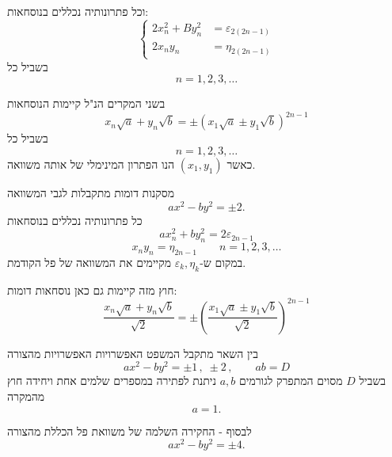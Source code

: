 וכל פתרונותיה נכללים בנוסחאות:
\[
\left\{
\begin{aligned}
2x_n^2 + By_n^2 &= \varepsilon_{2(2n-1)} \\
2x_ny_n &= \eta_{2(2n-1)}
\end{aligned}
\right.
\]
בשביל כל
\[ n = 1, 2, 3, \ldots \]

בשני המקרים הנ"ל קיימות הנוסחאות
\[ x_n\sqrt{a} + y_n\sqrt{b} = \pm(x_1\sqrt{a} \pm y_1\sqrt{b})^{2n-1} \]
בשביל כל
\[ n = 1, 2, 3, \ldots \]
כאשר $(x_1, y_1)$ הנו הפתרון המינימלי של אותה משוואה.

מסקנות דומות מתקבלות לגבי המשוואה
\[ ax^2 - by^2 = \pm 2 . \]
כל פתרונותיה נכללים בנוסחאות
\[ ax_n^2 + by_n^2 = 2\varepsilon_{2n-1} \]
\[ x_ny_n = \eta_{2n-1} \qquad n = 1, 2, 3, \ldots \]
במקום ש-$\varepsilon_k, \eta_k$ מקיימים את המשוואה של פל הקודמת.

חוץ מזה קיימות גם כאן נוסחאות דומות:
\[ \frac{x_n\sqrt{a} + y_n\sqrt{b}}{\sqrt{2}} = \pm\left(\frac{x_1\sqrt{a} \pm y_1\sqrt{b}}{\sqrt{2}}\right)^{2n-1} \]

בין השאר מתקבל המשפט האפשרויות האפשרויות מהצורה
\[ ax^2 - by^2 = \pm 1 \, , \; \pm 2 \, , \qquad ab = D \]
בשביל $D$ מסוים המתפרק לגורמים $a, b$ ניתנת לפתירה במספרים שלמים אחת ויחידה חוץ מהמקרה
\[ a = 1 . \]

לבסוף - החקירה השלמה של משוואת פל הכללת מהצורה
\[ ax^2 - by^2 = \pm 4 . \]

